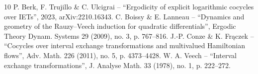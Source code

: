 \documentclass[10pt,a4paper]{amsart}
\theoremstyle{plain}
\theoremstyle{definition}
\begin{document}
\begin{thebibliography}{10}
 P. Berk, F. Trujillo \& C. Ulcigrai – “Ergodicity of explicit logarithmic cocycles over IETs”, 2023, arXiv:2210.16343.
 C. Boissy \& E. Lanneau – “Dynamics and geometry of the Rauzy–Veech induction for quadratic differentials”, Ergodic Theory Dynam. Systems 29 (2009), no. 3, p. 767–816.
 J.-P. Conze \& K. Frączek – “Cocycles over interval exchange transformations and multivalued Hamiltonian flows”, Adv. Math. 226 (2011), no. 5, p. 4373–4428.
 W. A. Veech – “Interval exchange transformations”, J. Analyse Math. 33 (1978), no. 1, p. 222–272.
\end{thebibliography}
\end{document}
